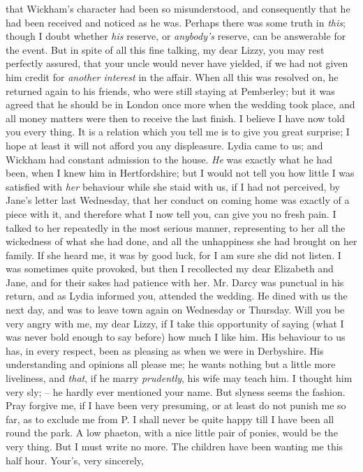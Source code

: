 \begin{letter}
that Wickham’s character had been so misunderstood,
and consequently that he had been received and noticed
as he was. Perhaps there was some truth in \textit{this}; though
I doubt whether \textit{his} reserve, or \textit{anybody’s} reserve, can be
answerable for the event. But in spite of all this fine
talking, my dear Lizzy, you may rest perfectly assured,
that your uncle would never have yielded, if we had not
given him credit for \textit{another interest} in the affair. When
all this was resolved on, he returned again to his friends,
who were still staying at Pemberley; but it was agreed
that he should be in London once more when the wedding
took place, and all money matters were then to receive
the last finish. I believe I have now told you every
thing. It is a relation which you tell me is to give you
great surprise; I hope at least it will not afford you any
displeasure. Lydia came to us; and Wickham had
constant admission to the house. \textit{He} was exactly what
he had been, when I knew him in Hertfordshire; but
I would not tell you how little I was satisfied with \textit{her}
behaviour while she staid with us, if I had not perceived,
by Jane’s letter last Wednesday, that her conduct on
coming home was exactly of a piece with it, and therefore
what I now tell you, can give you no fresh pain. I talked
to her repeatedly in the most serious manner, representing to
her all the wickedness of what she had done, and all the
unhappiness she had brought on her family. If she heard
me, it was by good luck, for I am sure she did not listen.
I was sometimes quite provoked, but then I recollected
my dear Elizabeth and Jane, and for their sakes had
patience with her. Mr. Darcy was punctual in his return,
and as Lydia informed you, attended the wedding. He
dined with us the next day, and was to leave town again
on Wednesday or Thursday. Will you be very angry with
me, my dear Lizzy, if I take this opportunity of saying
(what I was never bold enough to say before) how much
I like him. His behaviour to us has, in every respect, been
as pleasing as when we were in Derbyshire. His understanding
and opinions all please me; he wants nothing
but a little more liveliness, and \textit{that}, if he marry \textit{prudently},
his wife may teach him. I thought him very sly; -- he
hardly ever mentioned your name. But slyness seems the
fashion. Pray forgive me, if I have been very presuming,
or at least do not punish me so far, as to exclude me from
P. I shall never be quite happy till I have been all round
the park. A low phaeton, with a nice little pair of ponies,
would be the very thing. But I must write no more.
The children have been wanting me this half hour. Your’s,
very sincerely,

\end{letter}

